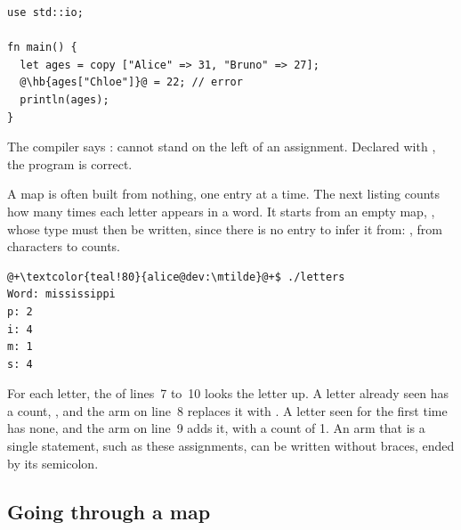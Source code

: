 \begin{lstlisting}[style=coloredverbatimError, escapechar=@, caption=Adding an entry to a map declared with \token{let}]
use std::io;

fn main() {
  let ages = copy ["Alice" => 31, "Bruno" => 27];
  @\hb{ages["Chloe"]}@ = 22; // error
  println(ages);
}
\end{lstlisting}

The compiler says :  cannot
stand on the left of an assignment. Declared with , the
program is correct.

A map is often built from nothing, one entry at a time. The next listing counts
how many times each letter appears in a word. It starts from an empty map,
, whose type must then be written, since there is no entry to
infer it from: \token{[c8 => i32]}, from characters to counts.


\vspace{-10pt}%
\begin{lstlisting}[style=bashVerb, escapechar=@+]
@+\textcolor{teal!80}{alice@dev:\mtilde}@+$ ./letters
Word: mississippi
p: 2
i: 4
m: 1
s: 4
\end{lstlisting}

For each letter, the  of lines~7 to~10 looks the letter up. A letter
already seen has a count, , and the arm on line~8 replaces it with
. A letter seen for the first time has none, and the arm on line~9
adds it, with a count of 1. An arm that is a single statement, such as these
assignments, can be written without braces, ended by its semicolon.


\subsection{Going through a map}

